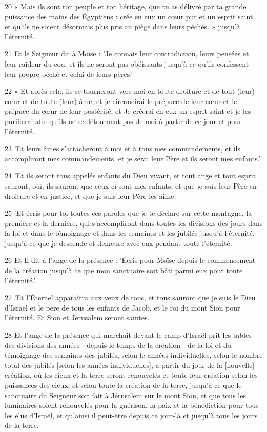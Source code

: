 \par 20 « Mais ils sont ton peuple et ton héritage, que tu as délivré par ta grande puissance des mains des Égyptiens : crée en eux un cœur pur et un esprit saint, et qu'ils ne soient désormais plus pris au piège dans leurs péchés. » jusqu'à l'éternité.
\par 21 Et le Seigneur dit à Moïse : 'Je connais leur contradiction, leurs pensées et leur raideur du cou, et ils ne seront pas obéissants jusqu'à ce qu'ils confessent leur propre péché et celui de leurs pères.'
\par 22 « Et après cela, ils se tourneront vers moi en toute droiture et de tout (leur) cœur et de toute (leur) âme, et je circoncirai le prépuce de leur cœur et le prépuce du cœur de leur postérité, et Je créerai en eux un esprit saint et je les purifierai afin qu'ils ne se détournent pas de moi à partir de ce jour et pour l'éternité.
\par 23 'Et leurs âmes s'attacheront à moi et à tous mes commandements, et ils accompliront mes commandements, et je serai leur Père et ils seront mes enfants.'
\par 24 'Et ils seront tous appelés enfants du Dieu vivant, et tout ange et tout esprit sauront, oui, ils sauront que ceux-ci sont mes enfants, et que je suis leur Père en droiture et en justice, et que je suis leur Père les aime.'
\par 25 'Et écris pour toi toutes ces paroles que je te déclare sur cette montagne, la première et la dernière, qui s'accompliront dans toutes les divisions des jours dans la loi et dans le témoignage et dans les semaines et les jubilés jusqu'à l'éternité, jusqu'à ce que je descende et demeure avec eux pendant toute l'éternité.
\par 26 Et Il dit à l'ange de la présence : 'Écris pour Moïse depuis le commencement de la création jusqu'à ce que mon sanctuaire soit bâti parmi eux pour toute l'éternité.'
\par 27 'Et l'Éternel apparaîtra aux yeux de tous, et tous sauront que je suis le Dieu d'Israël et le père de tous les enfants de Jacob, et le roi du mont Sion pour l'éternité. Et Sion et Jérusalem seront saintes.
\par 28 Et l'ange de la présence qui marchait devant le camp d'Israël prit les tables des divisions des années - depuis le temps de la création - de la loi et du témoignage des semaines des jubilés, selon le années individuelles, selon le nombre total des jubilés [selon les années individuelles], à partir du jour de la [nouvelle] création, où les cieux et la terre seront renouvelés et toute leur création selon les puissances des cieux, et selon toute la création de la terre, jusqu'à ce que le sanctuaire du Seigneur soit fait à Jérusalem sur le mont Sion, et que tous les luminaires soient renouvelés pour la guérison, la paix et la bénédiction pour tous les élus d'Israël, et qu'ainsi il peut-être depuis ce jour-là et jusqu'à tous les jours de la terre.

